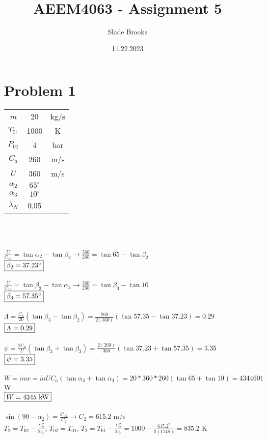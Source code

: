 \documentclass{article}
\title{AEEM4063 - Assignment 5}
\author{Slade Brooks}
\date{11.22.2023}
\begin{document}
\maketitle

\section*{Problem 1}
\begin{tabular}{ccc}
    $\dot{m}$ & 20 & kg/s \\
    $T_{01}$ & 1000 & K \\
    $P_{01}$ & 4 & bar \\
    $C_a$ & 260 & m/s \\
    $U$ & 360 & m/s \\
    $\alpha_2$ & $65^\circ$ \\
    $\alpha_3$ & $10^\circ$ \\
    $\lambda_N$ & 0.05
\end{tabular} \\\\\\
$\frac{U}{C_{a2}}=\tan\alpha_2-\tan\beta_2 \rightarrow \frac{360}{260}=\tan{65}-\tan\beta_2$ \\
$\fbox{$\beta_2 = 37.23^\circ$}$ \\\\
$\frac{U}{C_{a3}}=\tan\beta_3-\tan\alpha_3 \rightarrow \frac{360}{260}=\tan\beta_3-\tan{10}$ \\
$\fbox{$\beta_3 = 57.35^\circ$}$ \\\\
$\Lambda=\frac{C_a}{2U}(\tan\beta_3-\tan\beta_2)=\frac{260}{2(360)}(\tan57.35-\tan37.23)=0.29$ \\
$\fbox{$\Lambda=0.29$}$ \\\\
$\psi=\frac{2C_a}{U}(\tan\beta_2+\tan\beta_3)=\frac{2(260)}{360}(\tan37.23+\tan57.35)=3.35$ \\
$\fbox{$\psi=3.35$}$ \\\\
$W=\dot{m}w=\dot{m}UC_a(\tan\alpha_2+\tan\alpha_3)=20*360*260(\tan65+\tan10)=4344601$ W \\
$\fbox{$W=4345$ kW}$ \\\\
$\sin(90-\alpha_2)=\frac{C_{a2}}{C_2} \rightarrow C_2=615.2$ m/s \\
$T_2=T_{02}-\frac{C_2^2}{2c_p}$, \quad $T_{02}=T_{01}$, \quad $T_2=T_{01}-\frac{C_2^2}{2c_p}=
1000-\frac{615.2^2}{2(1148)}=835.2$ K \\
\end{document}
